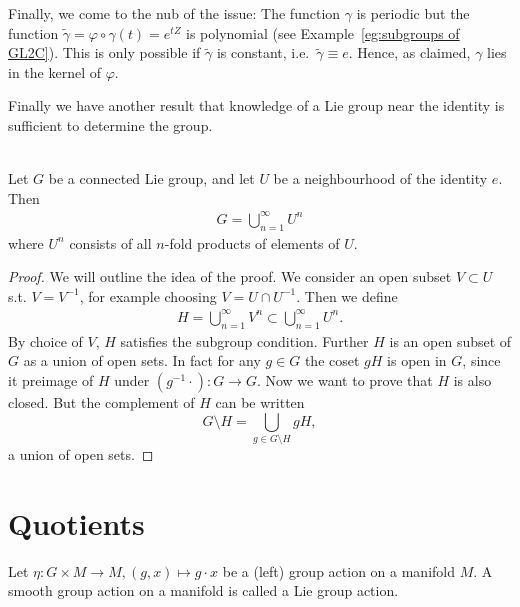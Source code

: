 Finally, we come to the nub of the issue: The function $\gamma$ is periodic but the function $\tilde{\gamma} = \varphi\circ \gamma(t) = e^{tZ}$ is polynomial (see Example~\ref{eg:subgroups of GL2C}).
This is only possible if $\tilde{\gamma}$ is constant, i.e.\ $\tilde{\gamma} \equiv e$.
Hence, as claimed, $\gamma$ lies in the kernel of $\varphi$.





Finally we have another result that knowledge of a Lie group near the identity is sufficient to determine the group.
\begin{theorem}
\label{thm:local generation}
\textup{\cite[3.18]{Warner1983}}\\
Let $G$ be a connected Lie group, and let $U$ be a neighbourhood of the identity $e$. Then 
\begin{align*}
G= \bigcup_{n=1}^{\infty} U^n
\end{align*}
where $U^n$ consists of all $n$-fold products of elements of $U$.
\end{theorem}

\begin{proof}
We will outline the idea of the proof. We consider an open subset $V \subset U$ s.t. $V=V^{-1}$, for example choosing $V = U\cap U^{-1}$. Then we define 
\begin{align*}
H = \bigcup_{n=1}^{\infty} V^n \subset \bigcup_{n=1}^{\infty} U^n.
\end{align*}
By choice of $V$, $H$ satisfies the subgroup condition. Further $H$ is an open subset of $G$ as a union of open sets. In fact for any $g \in G$ the coset $gH$ is open in $G$, since it preimage of $H$ under $(g^{-1} \cdot) : G \to G$.
Now we want to prove that $H$ is also closed. But the complement of $H$ can be written
\[
G \setminus H = \bigcup_{g \in G \setminus H} gH,
\]
a union of open sets.
\end{proof}




\section{Quotients}
\begin{definition}
Let $\eta \colon G \times M \to M, (g,x) \mapsto g \cdot x$ be a (left) group action on a manifold $M$. A smooth group action on a manifold is called a Lie group action.
\end{definition}

